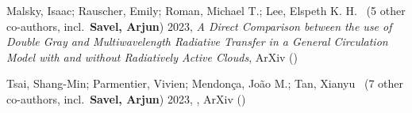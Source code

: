 \item[{\color{numcolor}\scriptsize2}] Malsky, Isaac; Rauscher, Emily; Roman, Michael T.; Lee, Elspeth K. H. \etal\ ({5} other co-authors, incl.\ \textbf{Savel, Arjun}) 2023, \emph{A Direct Comparison between the use of Double Gray and Multiwavelength Radiative Transfer in a General Circulation Model with and without Radiatively Active Clouds}, ArXiv ()

\item[{\color{numcolor}\scriptsize1}] Tsai, Shang-Min; Parmentier, Vivien; Mendon{\c{c}}a, Jo{\~a}o M.; Tan, Xianyu \etal\ ({7} other co-authors, incl.\ \textbf{Savel, Arjun}) 2023, , ArXiv ()